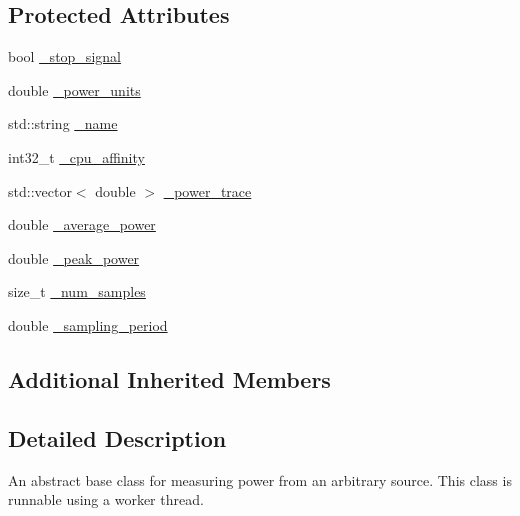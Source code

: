 \subsection*{Protected Attributes}
\begin{DoxyCompactItemize}
\item 
bool \hyperlink{classxmem_1_1power_1_1_power_reader_a1c0c890279f3f2b7eb41ab3e5889bf2e}{\-\_\-stop\-\_\-signal}
\item 
double \hyperlink{classxmem_1_1power_1_1_power_reader_a2835c933bd4807d6b3133a521dd76641}{\-\_\-power\-\_\-units}
\item 
std\-::string \hyperlink{classxmem_1_1power_1_1_power_reader_a85791da354d03c0a0f7ca4cf38b89e4c}{\-\_\-name}
\item 
int32\-\_\-t \hyperlink{classxmem_1_1power_1_1_power_reader_a0f95e6c4e8caa6db8de3fcf78509e887}{\-\_\-cpu\-\_\-affinity}
\item 
std\-::vector$<$ double $>$ \hyperlink{classxmem_1_1power_1_1_power_reader_ac8ad4bada42912ece1cbb0769dbe3b4d}{\-\_\-power\-\_\-trace}
\item 
double \hyperlink{classxmem_1_1power_1_1_power_reader_a1ad637b79a21519c20f9dda64fc1b908}{\-\_\-average\-\_\-power}
\item 
double \hyperlink{classxmem_1_1power_1_1_power_reader_a0bfe4f56c143f3febb404d85558e45fa}{\-\_\-peak\-\_\-power}
\item 
size\-\_\-t \hyperlink{classxmem_1_1power_1_1_power_reader_a296a8d15083e01e33590cbcd836aa07b}{\-\_\-num\-\_\-samples}
\item 
double \hyperlink{classxmem_1_1power_1_1_power_reader_a1c7d9b505d3c94347c43437a568e5948}{\-\_\-sampling\-\_\-period}
\end{DoxyCompactItemize}
\subsection*{Additional Inherited Members}


\subsection{Detailed Description}
An abstract base class for measuring power from an arbitrary source. This class is runnable using a worker thread. 

